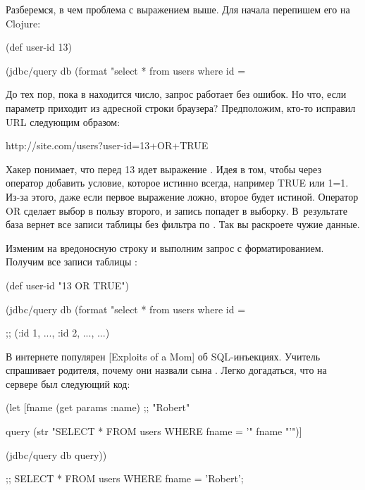 Разберемся, в чем проблема с выражением выше. Для начала перепишем его на Clojure:

\begin{english}
  \begin{clojure}
(def user-id 13)

(jdbc/query db
  (format "select * from users where id = %
  \end{clojure}
\end{english}

До тех пор, пока в  находится число, запрос работает без ошибок. Но что, если параметр приходит из адресной строки браузера? Предположим, кто-то исправил URL следующим образом:

\begin{english}
  \begin{text}
http://site.com/users?user-id=13+OR+TRUE
  \end{text}
\end{english}

Хакер понимает, что перед 13 идет выражение . Идея в том, чтобы через оператор  добавить условие, которое истинно всегда, например TRUE или 1=1. Из-за этого, даже если первое выражение ложно, второе будет истиной. Оператор OR сделает выбор в пользу второго, и запись попадет в выборку. В~результате база вернет все записи таблицы без фильтра по . Так вы раскроете чужие данные.

Изменим  на вредоносную строку и выполним запрос с форматированием. Получим все записи таблицы :

\begin{english}
  \begin{clojure}
(def user-id
  "13 OR TRUE")

(jdbc/query db
  (format "select * from users where id = %

;; ({:id 1, ...}, {:id 2, ...}, ...)
  \end{clojure}
\end{english}

\def\urlxkcdsql{https://xkcd.com/327/}


В интернете популярен \footurl{комикс Xkcd}{\urlxkcdsql}[Exploits of a Mom] об SQL-инъекциях. Учитель спрашивает родителя, почему они назвали сына . Легко догадаться, что на сервере был следующий код:

\begin{english}
  \begin{clojure}
(let [fname
      (get params :name) ;; "Robert"

      query
      (str "SELECT * FROM users WHERE fname = '"
           fname
           "'")]

  (jdbc/query db query))

;; SELECT * FROM users WHERE fname = 'Robert';
  \end{clojure}
\end{english}

